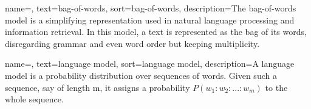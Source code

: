 {
    name=,
    text=bag-of-words,
    sort=bag-of-words,
    description={The bag-of-words model is a simplifying representation used in natural language processing and information retrieval. In this model, a text is represented as the bag of its words, disregarding grammar and even word order but keeping multiplicity.}
}

{
    name=,
    text=language model,
    sort=language model,
    description={A language model is a probability distribution over sequences of words. Given such a sequence, say of length m, it assigns a probability $P(w_1:w_2:...:w_m)$ to the whole sequence.}
}





